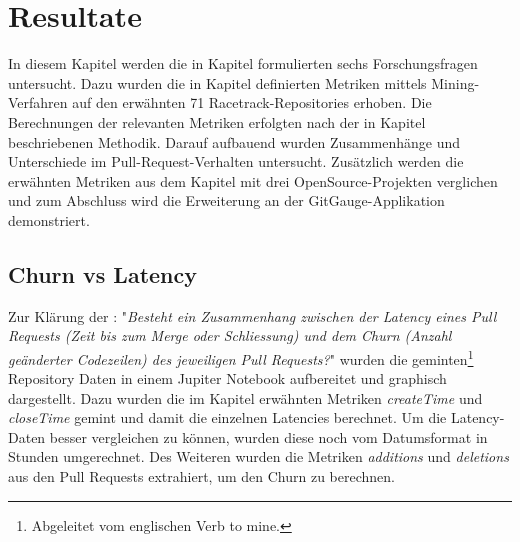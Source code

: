 


\chapter{Resultate} %

\label{Chapter4} %

In diesem Kapitel werden die in Kapitel  formulierten sechs Forschungsfragen untersucht. Dazu wurden die in Kapitel  definierten Metriken mittels Mining-Verfahren auf den erwähnten 71 Racetrack-Repositories erhoben. Die Berechnungen der relevanten Metriken erfolgten nach der in Kapitel  beschriebenen Methodik. Darauf aufbauend wurden Zusammenhänge und Unterschiede im Pull-Request-Verhalten untersucht. Zusätzlich werden die erwähnten Metriken aus dem Kapitel  mit drei OpenSource-Projekten verglichen und zum Abschluss wird die Erweiterung an der GitGauge-Applikation demonstriert. 


\section{Churn vs Latency}
\label{sec:ResultatChurnLatency}
Zur Klärung der : "\textit{Besteht ein Zusammenhang zwischen der Latency eines Pull
Requests (Zeit bis zum Merge oder Schliessung) und dem Churn (Anzahl geänderter Codezeilen) des jeweiligen Pull Requests?}" wurden die geminten\footnote{Abgeleitet vom englischen Verb to mine.} Repository Daten in einem Jupiter Notebook aufbereitet und graphisch dargestellt. Dazu wurden die im Kapitel  erwähnten Metriken \textit{createTime} und \textit{closeTime} gemint und damit die einzelnen Latencies berechnet. Um die Latency-Daten besser vergleichen zu können, wurden diese noch vom Datumsformat in Stunden umgerechnet. Des Weiteren wurden die Metriken  \textit{additions} und  \textit{deletions} aus den Pull Requests extrahiert, um den Churn zu berechnen.

